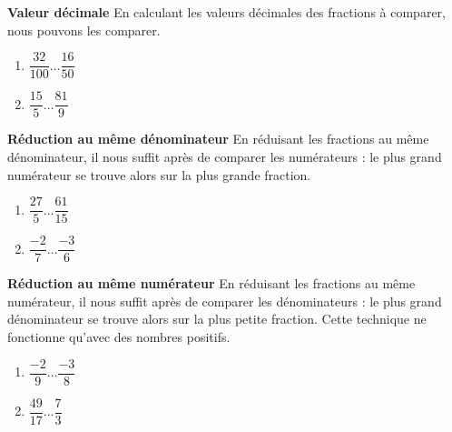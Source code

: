 \documentclass[../../syllabus_2.tex]{subfiles}
\begin{document}
\textbf{Valeur décimale}
En calculant les valeurs décimales des fractions à comparer, nous pouvons les comparer.

\exemples
\begin{enumerate}[cols=2]
  \item $\dfrac{32}{100} \ldots \dfrac{16}{50} $
  \item $\dfrac{15}{5} \ldots \dfrac{81}{9} $
\end{enumerate}
\vfill

\textbf{Réduction au même dénominateur}
En réduisant les fractions au même dénominateur, il nous suffit après de comparer les numérateurs : le plus grand numérateur se trouve alors sur la plus grande fraction.

\exemples
\begin{enumerate}[cols=2]
  \item $\dfrac{27}{5} \ldots \dfrac{61}{15} $
  \item $\dfrac{-2}{7} \ldots \dfrac{-3}{6} $
\end{enumerate}
\vfill

\textbf{Réduction au même numérateur}
En réduisant les fractions au même numérateur, il nous suffit après de comparer les dénominateurs : le plus grand dénominateur se trouve alors sur la plus petite fraction. Cette technique ne fonctionne qu'avec des nombres positifs.

\exemples
\begin{enumerate}[cols=2]
  \item $\dfrac{-2}{9} \ldots \dfrac{-3}{8} $
  \item $\dfrac{49}{17} \ldots \dfrac{7}{3} $
\end{enumerate}

%
%
\end{document}
